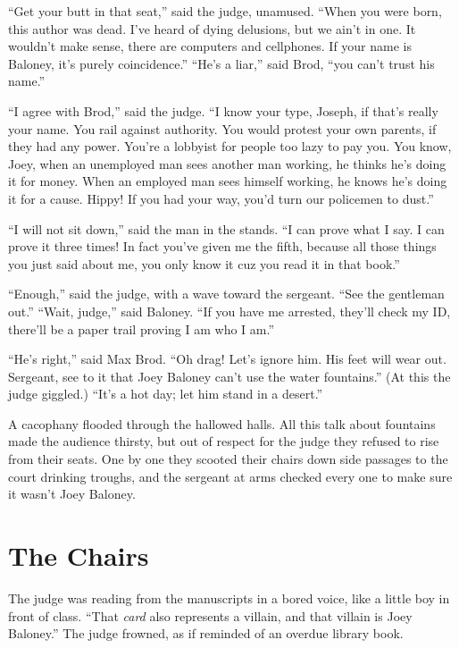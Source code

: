 \documentclass[oneside]{book}
\begin{document}
``Get your butt in that seat,'' said the judge, unamused.  ``When you were born,
this author was dead.  I've heard of dying delusions, but we ain't in one.
It wouldn't make sense, there are computers and cellphones.
If your name is Baloney, it's purely coincidence.''   ``He's a liar,'' said Brod,
``you can't trust his name.''

``I agree with Brod,'' said the judge.  ``I know your type, Joseph, if that's really your name.
You rail against authority.  You would protest your own parents, if they had any power.
You're a lobbyist for people too lazy to pay you.
You know, Joey, when an unemployed man sees another man working, he thinks he's doing it
for money.  When an employed man sees himself working, he knows he's doing it for a cause.
Hippy!
If you had your way, you'd turn our policemen to dust.''


``I will not sit down,'' said the man in the stands.  ``I can prove what I say.
I can prove it three times!  In fact you've given me the fifth, because all those
things you just said about me, you only know it cuz you read it in that book.''

``Enough,'' said the judge, with a wave toward the sergeant.
``See the gentleman out.''  ``Wait, judge,'' said Baloney.  ``If you have me
arrested, they'll check my ID, there'll be a paper trail proving I am who I am.''

``He's right,'' said Max Brod.  ``Oh drag!  Let's ignore him.  His feet will
wear out.  Sergeant, see to it that Joey Baloney can't use the water fountains.''
(At this the judge giggled.)  ``It's a hot day; let him stand in a desert.''

A cacophany flooded through the hallowed halls.
All this talk about fountains made the audience thirsty,
but out of respect for the judge they refused to rise from their
seats.  One by one they scooted their chairs down side passages
to the court drinking troughs, and the sergeant at arms
checked every one to make sure it wasn't Joey Baloney.

\chapter{The Chairs}

The judge was reading from the manuscripts in a bored voice,
like a little boy in front of class.
``That \emph{card} also represents a villain,
and that villain is Joey Baloney.''  
The judge frowned,
as if reminded of an overdue library book.
\end{document}
